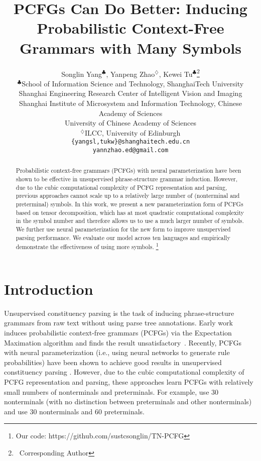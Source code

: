 \documentclass[11pt]{article}
\title{PCFGs Can Do Better: Inducing \\ Probabilistic Context-Free Grammars with Many Symbols}
\author{Songlin Yang$^{\clubsuit}$, Yanpeng Zhao$^{\diamondsuit}$, Kewei Tu$^{\clubsuit}$\thanks{\, 	 Corresponding Author}\\
  $^{\clubsuit}$School of Information Science and Technology, ShanghaiTech University \\
  \textsuperscript{}{Shanghai Engineering Research Center of Intelligent Vision and Imaging}\\
  \textsuperscript{}{Shanghai Institute of Microsystem and Information Technology, Chinese Academy of Sciences}\\
    \textsuperscript{}{University of Chinese Academy of Sciences}\\
 $^{\diamondsuit}${ILCC, University of Edinburgh}\\
    {\tt \{yangsl,tukw\}@shanghaitech.edu.cn}\\
    {\tt yannzhao.ed@gmail.com}
 }
\begin{document}
\maketitle
\begin{abstract}
Probabilistic context-free grammars (PCFGs) with neural parameterization have been shown to be effective in unsupervised phrase-structure grammar induction.
However, due to the cubic computational complexity of PCFG representation and parsing,
previous approaches cannot scale up to a relatively large number of (nonterminal and preterminal) symbols.
In this work, we present a new parameterization form of PCFGs based on tensor decomposition,
which has at most quadratic computational complexity in the symbol number and therefore allows us to use a much larger number of symbols.
We further use neural parameterization for the new form to improve unsupervised parsing performance.
We evaluate our model across ten languages and empirically demonstrate the effectiveness of using more symbols. \footnote{Our code: https://github.com/sustcsonglin/TN-PCFG}
\end{abstract}

\section{Introduction}

Unsupervised constituency parsing is the task of inducing phrase-structure grammars from raw text without using parse tree annotations.
Early work induces probabilistic context-free grammars (PCFGs) via the Expectation Maximation algorithm and finds the result unsatisfactory~\citep{lari1990estimation,carroll1992two}.
Recently, PCFGs with neural parameterization (i.e., using neural networks to generate rule probabilities) have been shown to achieve good results in unsupervised constituency parsing \cite{kim-etal-2019-compound,jin-etal-2019-unsupervised,zhu2020return}.
However, due to the cubic computational complexity of PCFG representation and parsing, these approaches learn PCFGs with relatively small numbers of nonterminals and preterminals. For example, \citet{jin-etal-2019-unsupervised} use 30 nonterminals (with no distinction between preterminals and other nonterminals) and \citet{kim-etal-2019-compound} use 30 nonterminals and 60 preterminals.
\end{document}
